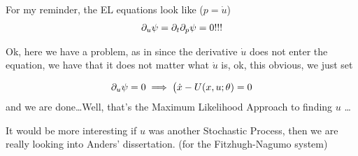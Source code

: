 \documentclass{article}
\begin{document}
For my reminder, the EL equations look like ($p = \dot{u}$)
\begin{align}
{\partial}_u \psi = {\partial}_t {\partial}_p \psi = 0!!!
\end{align}

Ok, here we have a problem, as in since the derivative $\dot{u}$ does not enter
the equation, we have that it does not matter what $\dot{u}$ is, ok, this
obvious, we just set 

$$
{\partial}_u \psi = 0  \implies \big( \dot{x} - U(x,u; {\theta} ) =0 
$$
and we are done\ldots Well, that's the Maximum Likelihood Approach to
finding $u$ \ldots

It would be more interesting if $u$ was another Stochastic Process, then we are
really looking into Anders' dissertation. (for the Fitzhugh-Nagumo system)


 

\end{document}

